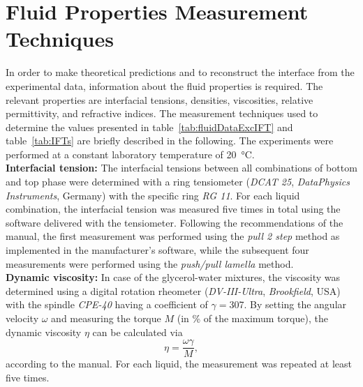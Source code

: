 \documentclass{jfm_arxiv}
\begin{document}


\appendix

\section{Fluid Properties Measurement Techniques}
\label{sec:appA-substances}

In order to make theoretical predictions and to reconstruct the interface from the experimental data, information about the fluid properties is required.
The relevant properties are interfacial tensions, densities, viscosities, relative permittivity, and refractive indices.
The measurement techniques used to determine the values presented in table~\ref{tab:fluidDataExcIFT} and table~\ref{tab:IFTs} are briefly described in the following.
The experiments were performed at a constant laboratory temperature of \SI{20}{\celsius}.\\

\textbf{Interfacial tension:}
The interfacial tensions between all combinations of bottom and top phase were determined with a ring tensiometer (\textit{DCAT 25}, \textit{DataPhysics Instruments}, Germany) with the specific ring \textit{RG 11}.
For each liquid combination, the interfacial tension was measured five times in total using the software delivered with the tensiometer.
Following the recommendations of the manual, the first measurement was performed using the \textit{pull 2 step} method as implemented in the manufacturer's software, while the subsequent four measurements were performed using the \textit{push/pull lamella} method. \\

\textbf{Dynamic viscosity:}
In case of the glycerol-water mixtures, the viscosity was determined using a digital rotation rheometer (\textit{DV-III-Ultra}, \textit{Brookfield}, USA) with the spindle \textit{CPE-40} having a coefficient of $\gamma =$307.
By setting the angular velocity $\omega$ and measuring the torque $M$ (in \% of the maximum torque), the dynamic viscosity $\eta$ can be calculated via
\begin{equation}
\eta = \frac{\omega \gamma}{M},
\label{eq:viscMeas}
\end{equation}
according to the manual.
For each liquid, the measurement was repeated at least five times.\\
\end{document}
